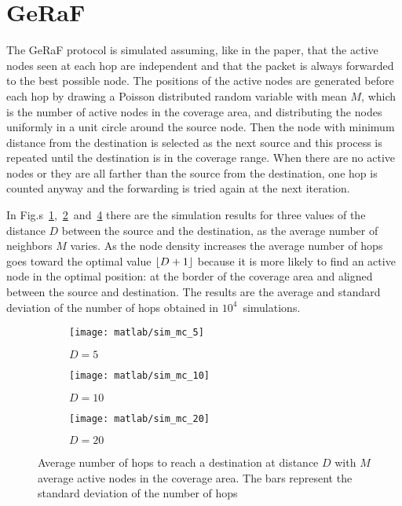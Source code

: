 \documentclass[a4paper,oneside]{article}
\begin{document}
\section{GeRaF}
The GeRaF protocol is simulated assuming, like in the paper, that the
active nodes seen at each hop are independent and that the packet is
always forwarded to the best possible node.
%
The positions of the active nodes are generated before each hop by
drawing a Poisson distributed random variable with mean $M$, which is
the number of active nodes in the coverage area, and distributing the
nodes uniformly in a unit circle around the source node.
%
Then the node with minimum distance from the destination is selected
as the next source and this process is repeated until the destination
is in the coverage range.
%
When there are no active nodes or they are all farther than the source
from the destination, one hop is counted anyway and the forwarding is
tried again at the next iteration.

In
Fig.s~\ref{plot:geraf_sim_5},~\ref{plot:geraf_sim_10}~and~\ref{plot:geraf_sim_20}
there are the simulation results for three values of the distance $D$
between the source and the destination, as the average number of
neighbors $M$ varies. As the node density increases the average number
of hops goes toward the optimal value $\left\lfloor D+1\right\rfloor$ because it is more
likely to find an active node in the optimal position: at the border
of the coverage area and aligned between the source and destination.
%
The results are the average and standard deviation of the number of
hops obtained in $10^4$~simulations.
\begin{figure}[htbp]
  \centering
  \begin{subfigure}{0.5\textwidth}
    \centering
    \texttt{[image: matlab/sim\_mc\_5]}
    \caption{$ D = 5 $}
    \label{plot:geraf_sim_5}
  \end{subfigure}%
  \begin{subfigure}{0.5\textwidth}
    \centering
    \texttt{[image: matlab/sim\_mc\_10]}
    \caption{$ D = 10 $}
    \label{plot:geraf_sim_10}
  \end{subfigure}
  \begin{subfigure}{0.5\textwidth}
    \centering
    \texttt{[image: matlab/sim\_mc\_20]}
    \caption{$ D = 20 $}
    \label{plot:geraf_sim_20}
  \end{subfigure}
  \caption{Average number of hops to reach a destination at distance
    $D$ with $M$ average active nodes in the coverage area. The bars
    represent the standard deviation of the number of hops}
\end{figure}
\end{document}
